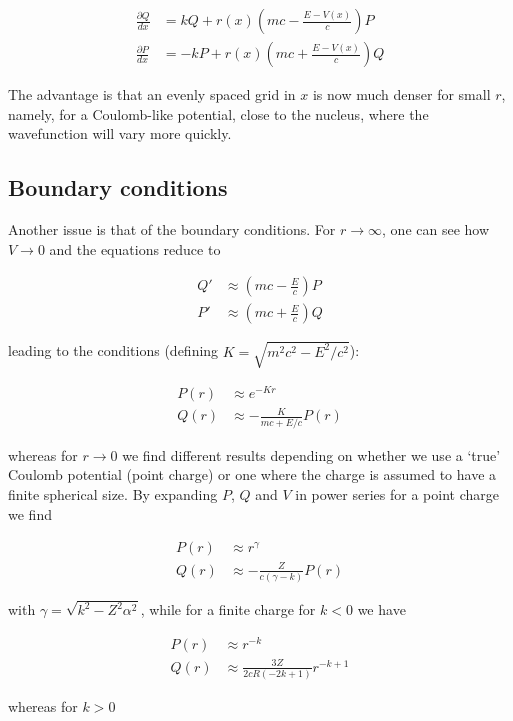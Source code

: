 \documentclass[]{report}
\begin{document}
\begin{align}\label{dirac_sys_log}
\frac{\partial Q}{dx} &= kQ + r(x)\left(mc-\frac{E-V(x)}{c}\right)P \\
\frac{\partial P}{dx} &= -kP + r(x)\left(mc+\frac{E-V(x)}{c}\right)Q
\end{align}

The advantage is that an evenly spaced grid in $x$ is now much denser for small $r$, namely, for a Coulomb-like potential, close to the nucleus, where the wavefunction will vary more quickly.

\subsection{Boundary conditions}
Another issue is that of the boundary conditions. For $r \rightarrow \infty$, one can see how $V \rightarrow 0$ and the equations reduce to \cite{silbar2010}

\begin{align}\label{dirac_sys_inf}
Q' &\approx \left(mc-\frac{E}{c}\right)P \\
P' &\approx \left(mc+\frac{E}{c}\right)Q
\end{align}

leading to the conditions (defining $K = \sqrt{m^2c^2-E^2/c^2}$):

\begin{align}
P(r) &\approx e^{-Kr} \\
Q(r) &\approx -\frac{K}{mc+E/c}P(r)
\end{align}

whereas for $r \rightarrow 0$ we find different results depending on whether we use a `true' Coulomb potential (point charge) or one where the charge is assumed to have a finite spherical size. By expanding $P$, $Q$ and $V$ in power series for a point charge we find \cite{grant2009}

\begin{align}
P(r) &\approx r^{\gamma} \\
Q(r) &\approx -\frac{Z}{c(\gamma-k)}P(r)
\end{align}

with $\gamma = \sqrt{k^2-Z^2\alpha^2}$, while for a finite charge for $k < 0$ we have

\begin{align}
P(r) &\approx r^{-k} \\
Q(r) &\approx \frac{3Z}{2cR(-2k+1)}r^{-k+1}
\end{align}

whereas for $k > 0$
\end{document}
